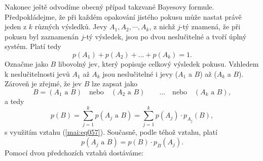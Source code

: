       
      
      
      
      Nakonec ještě odvodíme obecný případ takzvané Bayesovy formule. Předpokládejme, že při
      každém opakování jistého pokusu může nastat právě jeden z \(k\) různých výsledků. Jevy \(A_1,
      A_2,\cdots, A_k\), z nichž \(j\)-tý znamená, že při pokusu byl zaznamenán \(j\)-tý výsledek, 
      jsou po dvou neslučitelné a tvoří úplný systém. Platí tedy
      \begin{equation*}
        p(A_1) + p(A_2) + \ldots  + p(A_k) = 1.
      \end{equation*}
      Označme jako \(B\) libovolný jev, který popisuje celkový výsledek pokusu. Vzhledem k 
      neslučitelnosti jevů \(A_1\) až \(A_k\) jsou neslučitelné i jevy (\(A_1\) a \(B\)) až 
      (\(A_k\) a \(B\)). Zároveň je zřejmé, že jev \(B\) lze zapsat jako
     \begin{equation*}
       B = (A_1\text{ a }B) \quad\text{nebo}\quad (A_2\text{ a }B) \qquad\ldots
       \quad\text{nebo}\quad (A_k\text{ a }B),
     \end{equation*} 
      a tedy
      \begin{equation*}
        p(B) = \sum_{j=1}^{k}p(A_j\text{ a }B) = \sum_{j=1}^{k}p(A_j)\cdot p_{A_j}(B),
      \end{equation*}
      s využitím vztahu (\ref{mai:eq057}). Současně, podle téhož vztahu, platí 
      \begin{equation*}
        p(A_j\text{ a }B) = p(B)\cdot  p_B(A_j).
      \end{equation*}
      Pomocí dvou předchozích vztahů dostáváme:
      
      
